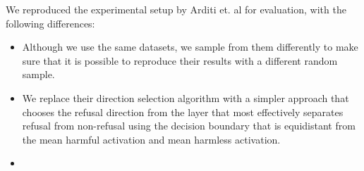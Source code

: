 \documentclass[10pt,letterpaper]{article}
\begin{document}
We reproduced the experimental setup by Arditi et. al for evaluation, with the following differences:
\begin{itemize}
    \item Although we use the same datasets, we sample from them differently to make sure that it is possible to reproduce their results with a different random sample.
    \item We replace their direction selection algorithm with a simpler approach that chooses the refusal direction from the layer that most effectively separates refusal from non-refusal using the decision boundary that is equidistant from the mean harmful activation and mean harmless activation.
    \item 
\end{itemize}
\end{document}
